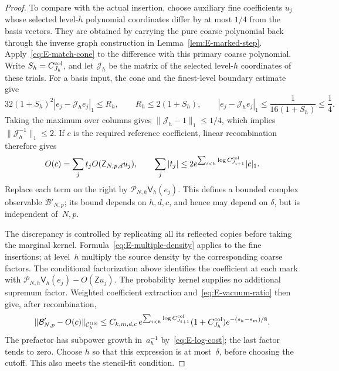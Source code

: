 \begin{proof}
To compare with the actual insertion, choose auxiliary fine coefficients $u_j$ whose selected level-$h$ polynomial coordinates differ by at most $1/4$ from the basis vectors. They are obtained by carrying the pure coarse polynomial back through the inverse graph construction in Lemma~\ref{lem:E-marked-step}. Apply~\eqref{eq:E-match-cone} to the difference with this primary coarse polynomial. Write $S_h=C^{\rm col}_{J_h}$, and let $\mathcal J_h$ be the matrix of the selected level-$h$ coordinates of these trials. For a basis input, the cone and the finest-level boundary estimate give
\begin{equation}\label{eq:E-coarse-inversion}
 32(1+S_h)^2|e_j-\mathcal J_he_j|_1\le R_h,
 \qquad R_h\le2(1+S_h),\qquad
 |e_j-\mathcal J_he_j|_1\le\frac1{16(1+S_h)}\le\frac14.
\end{equation}
Taking the maximum over columns gives $\|\mathcal J_h-1\|_1\le1/4$, which implies $\|\mathcal J_h^{-1}\|_1\le2$. If $c$ is the required reference coefficient, linear recombination therefore gives
\begin{equation*}
 O(c)=\sum_j t_j O(\mathsf Z_{N,p,d}u_j),\qquad
 \sum_j|t_j|\le2e^{\sum_{i<h}\log C^{\rm col}_{J_{i+1}}}|c|_1.
\end{equation*}
Replace each term on the right by $\mathcal P_{N,h}\mathsf V_h(e_j)$. This defines a bounded complex observable $\mathcal B'_{N,p}$; its bound depends on $h,d,c$, and hence may depend on $\delta$, but is independent of~$N,p$.

The discrepancy is controlled by replicating all its reflected copies before taking the marginal kernel. Formula~\eqref{eq:E-multiple-density} applies to the fine insertions; at level~$h$ multiply the source density by the corresponding coarse factors. The conditional factorization above identifies the coefficient at each mark with $\mathcal P_{N,h}\mathsf V_h(e_j)-O(\mathsf Z u_j)$. The probability kernel supplies no additional supremum factor. Weighted coefficient extraction and~\eqref{eq:E-vacuum-ratio} then give, after recombination,
\begin{equation}\label{eq:E-bounded-error}
 \|\mathcal B'_{N,p}-O(c)\|_{\mathcal C^{\rm tile}_k}
 \le C_{k,m,d,c}\,
 e^{\sum_{i<h}\log C^{\rm col}_{J_{i+1}}}(1+C^{\rm col}_{J_h})
 e^{-(s_h-s_m)/8}.
\end{equation}
The prefactor has subpower growth in~$a_h^{-1}$ by~\eqref{eq:E-log-cost}; the last factor tends to zero. Choose $h$ so that this expression is at most~$\delta$, before choosing the cutoff. This also meets the stencil-fit condition.


\end{proof}
